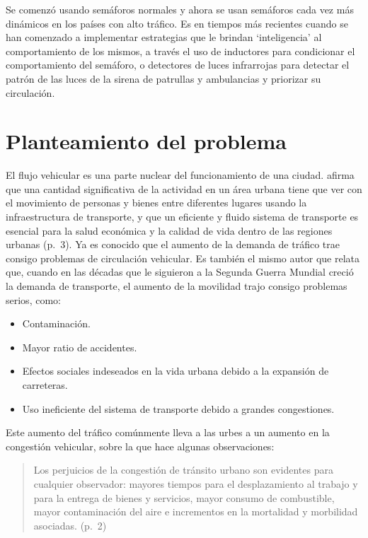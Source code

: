 Se comenzó usando semáforos normales y ahora se usan semáforos cada vez
más dinámicos en los países con alto tráfico. Es en tiempos más
recientes cuando se han comenzado a implementar estrategias que le
brindan `inteligencia' al comportamiento de los mismos, a través el uso
de inductores para condicionar el comportamiento del semáforo, o
detectores de luces infrarrojas para detectar el patrón de las luces de
la sirena de patrullas y ambulancias y priorizar su circulación.

\hypertarget{planteamiento-del-problema}{%
\section{Planteamiento del problema}\label{planteamiento-del-problema}}

El flujo vehicular es una parte nuclear del funcionamiento de una
ciudad. \textcite{Patriksson2012} afirma que una cantidad significativa
de la actividad en un área urbana tiene que ver con el movimiento de
personas y bienes entre diferentes lugares usando la infraestructura de
transporte, y que un eficiente y fluido sistema de transporte es
esencial para la salud económica y la calidad de vida dentro de las
regiones urbanas (p.~3). Ya es conocido que el aumento de la demanda de
tráfico trae consigo problemas de circulación vehicular. Es también el
mismo autor que relata que, cuando en las décadas que le siguieron a la
Segunda Guerra Mundial creció la demanda de transporte, el aumento de la
movilidad trajo consigo problemas serios, como:

\begin{itemize}
\item
  Contaminación.
\item
  Mayor ratio de accidentes.
\item
  Efectos sociales indeseados en la vida urbana debido a la expansión de
  carreteras.
\item
  Uso ineficiente del sistema de transporte debido a grandes
  congestiones.
\end{itemize}

Este aumento del tráfico comúnmente lleva a las urbes a un aumento en la
congestión vehicular, sobre la que \textcite{Medina-Durango2011} hace
algunas observaciones:

\begin{quote}
Los perjuicios de la congestión de tránsito urbano son evidentes para
cualquier observador: mayores tiempos para el desplazamiento al trabajo
y para la entrega de bienes y servicios, mayor consumo de combustible,
mayor contaminación del aire e incrementos en la mortalidad y morbilidad
asociadas. (p.~2)
\end{quote}

